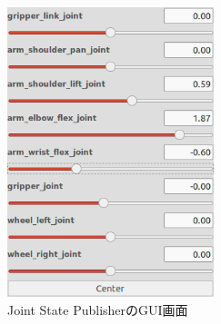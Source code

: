 \begin{figure}[htp]
  \centering
  \includegraphics[width=6cm]{pictures/chapter11/pic_11_43.png}
  \caption{Joint State PublisherのGUI画面}
\end{figure}


